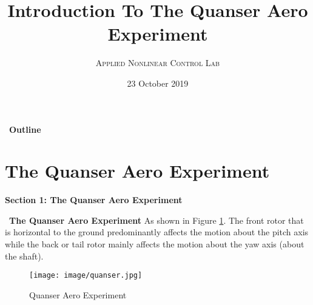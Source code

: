 \documentclass[blue,mathserif,envcountsect,compress,10pt,xcolor=pdftex,dvipsnames,table]{beamer}
\title[Introduction To The Quanser Aero Experiment]%
      {{\large\bf Introduction To The Quanser Aero Experiment} }%
\author[Shuai Qian]{\textsc{Applied Nonlinear Control Lab} \\
\medskip {\footnotesize %
}}%
\institute[{\sf NJUST}]%
          {\small\rm School of Automation \\ \vspace{0.15cm}%
          Nanjing University of Science and Technology}%
\date[]{23 October 2019}%
\begin{document}
\begin{frame}%
\thispagestyle{empty}%
\titlepage%

\end{frame}


\begin{frame}{\SquareShadowTopLeft~\bf Outline}

\large\tableofcontents%

\end{frame}


\section{\bf  The Quanser Aero Experiment}

\begin{frame}%

\thispagestyle{empty}%

\begin{center}
{\bf\color{blue}\large Section 1: The Quanser Aero Experiment}
\end{center}
\end{frame}

\begin{frame}{\SquareShadowTopLeft~\bf The Quanser Aero Experiment}
As shown in Figure \ref{quanser}. The front rotor that is horizontal to the ground predominantly affects the motion about the pitch axis while the back or tail rotor mainly affects the motion about the yaw axis (about the shaft).
\begin{figure}
  \centering
  \texttt{[image: image/quanser.jpg]}
  \caption{Quanser Aero Experiment}\label{quanser}
\end{figure}
\end{frame}
\end{document}
